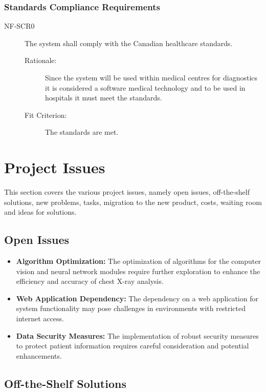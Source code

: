 \documentclass[12pt]{article}
\begin{document}
\subsubsection{Standards Compliance Requirements}
\begin{description}
    \item[NF-SCR0] The system shall comply with the Canadian healthcare standards. 
        \begin{description}
        \item[Rationale:] Since the system will be used within medical centres for diagnostics it is considered a software medical technology and to be used in hospitals it must meet the standards. 
        \item[Fit Criterion:] The standards are met. 
    \end{description}
\end{description}

\section{Project Issues}
This section covers the various project issues, namely open issues, off-the-shelf solutions,
new problems, tasks, migration to the new product, costs, waiting room and ideas for solutions.

\subsection{Open Issues}
\begin{itemize}
    \item \textbf{Algorithm Optimization:} The optimization of algorithms for the computer vision and neural network modules require further exploration to enhance the efficiency and accuracy of chest X-ray analysis.
    \item \textbf{Web Application Dependency:} The dependency on a web application for system functionality may pose challenges in environments with restricted internet access.
    \item \textbf{Data Security Measures:} The implementation of robust security measures to protect patient information requires careful consideration and potential enhancements.
\end{itemize}

\subsection{Off-the-Shelf Solutions}
\end{document}
